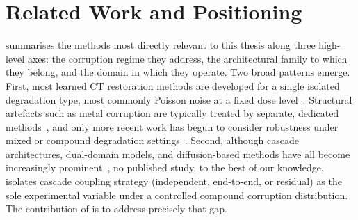 \section{Related Work and Positioning}
\label{sec:bg_related}

 summarises the methods most directly relevant to this thesis along three high-level axes: the corruption regime they address, the architectural family to which they belong, and the domain in which they operate. Two broad patterns emerge. First, most learned CT restoration methods are developed for a single isolated degradation type, most commonly Poisson noise at a fixed dose level~\cite{Chen2017, Zhang2017, Komolafe2024, Zhang2023}. Structural artefacts such as metal corruption are typically treated by separate, dedicated methods~\cite{ZhangYu2018, Gjesteby2016}, and only more recent work has begun to consider robustness under mixed or compound degradation settings~\cite{Liang2025}. Second, although cascade architectures, dual-domain models, and diffusion-based methods have all become increasingly prominent~\cite{Schlemper2018, Wang2020, Zhang2022, Song2022, Chung2023, Liu2023DOLCE, DM4CT2025}, no published study, to the best of our knowledge, isolates cascade coupling strategy (independent, end-to-end, or residual) as the sole experimental variable under a controlled compound corruption distribution. The contribution of  is to address precisely that gap.
